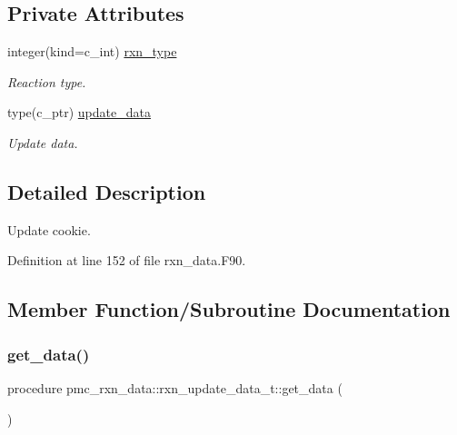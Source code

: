 \subsection*{Private Attributes}
\begin{DoxyCompactItemize}
\item 
integer(kind=c\+\_\+int) \mbox{\hyperlink{structpmc__rxn__data_1_1rxn__update__data__t_a244ad4d300a7be7172d31ca81f8f3593}{rxn\+\_\+type}}
\begin{DoxyCompactList}\small\item\em Reaction type. \end{DoxyCompactList}\item 
type(c\+\_\+ptr) \mbox{\hyperlink{structpmc__rxn__data_1_1rxn__update__data__t_aae0fc951efa345e6f8158fb646708322}{update\+\_\+data}}
\begin{DoxyCompactList}\small\item\em Update data. \end{DoxyCompactList}\end{DoxyCompactItemize}


\subsection{Detailed Description}
Update cookie. 

Definition at line 152 of file rxn\+\_\+data.\+F90.



\subsection{Member Function/\+Subroutine Documentation}
\mbox{\label{structpmc__rxn__data_1_1rxn__update__data__t_aa394fd7c9af151a007c31c27824ff4f3}} 
\subsubsection{\texorpdfstring{get\+\_\+data()}{get\_data()}}
{\footnotesize\ttfamily procedure pmc\+\_\+rxn\+\_\+data\+::rxn\+\_\+update\+\_\+data\+\_\+t\+::get\+\_\+data (\begin{DoxyParamCaption}{ }\end{DoxyParamCaption})\hspace{0.3cm}{\ttfamily [private]}}



